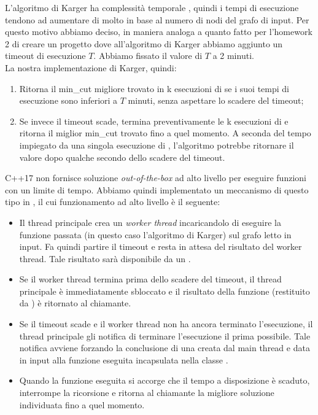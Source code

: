 \noindent L'algoritmo di Karger ha complessità temporale \complexityKargerTime{}, quindi i tempi di esecuzione tendono ad aumentare di molto in base al numero di nodi del grafo di input. Per questo motivo abbiamo deciso, in maniera analoga a quanto fatto per l'homework 2 di creare un progetto dove all'algoritmo di Karger abbiamo aggiunto un timeout di esecuzione $T$. Abbiamo fissato il valore di $T$ a 2 minuti.\\

\noindent La nostra implementazione di Karger, quindi:

\begin{enumerate}
    \item Ritorna il min\_cut migliore trovato in k esecuzioni di  se i suoi tempi di esecuzione sono inferiori a $T$ minuti, senza aspettare lo scadere del timeout;
    \item Se invece il timeout scade, termina preventivamente le k esecuzioni di  e ritorna il miglior min\_cut trovato fino a quel momento. A seconda del tempo impiegato da una singola esecuzione di , l'algoritmo potrebbe ritornare il valore dopo qualche secondo dello scadere del timeout.
\end{enumerate}

\noindent C++17 non fornisce soluzione \textit{out-of-the-box} ad alto livello per eseguire funzioni con un limite di tempo. Abbiamo quindi implementato un meccanismo di questo tipo in , il cui funzionamento ad alto livello è il seguente:

\begin{itemize}
    \item Il thread principale crea un \textit{worker thread} incaricandolo di eseguire la funzione passata (in questo caso l'algoritmo di Karger) sul grafo letto in input. Fa quindi partire il timeout e resta in attesa del risultato del worker thread. Tale risultato sarà disponibile da un .
    \item Se il worker thread termina prima dello scadere del timeout, il thread principale è immediatamente sbloccato e il risultato della funzione (restituito da ) è ritornato al chiamante.
    \item Se il timeout scade e il worker thread non ha ancora terminato l'esecuzione, il thread principale gli notifica di terminare l'esecuzione il prima possibile. Tale notifica avviene forzando la conclusione di una  creata dal main thread e data in input alla funzione eseguita incapsulata nella classe .
    \item Quando la funzione eseguita si accorge che il tempo a disposizione è scaduto, interrompe la ricorsione e ritorna al chiamante la migliore soluzione individuata fino a quel momento.
\end{itemize}
